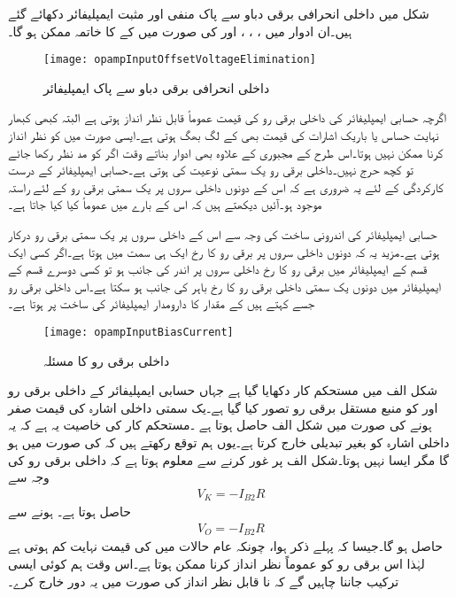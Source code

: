 شکل  میں داخلی انحرافی برقی دباو سے پاک منفی اور مثبت ایمپلیفائر دکھائے گئے ہیں۔ان ادوار میں ، ، ،  اور   کی صورت میں  کے  کا خاتمہ ممکن ہو گا۔ 
\begin{figure}
\centering
\texttt{[image: opampInputOffsetVoltageElimination]}
\caption{داخلی انحرافی برقی دباو سے پاک ایمپلیفائر}
\label{شکل_داخلی_انحرافی_برقی_دباو_سے_پاک_ایمپلیفائر}
\end{figure}
 

اگرچہ حسابی ایمپلیفائر کی داخلی برقی رو   کی قیمت عموماً قابل نظر انداز ہوتی ہے البتہ کبھی کبھار نہایت حساس یا باریک اشارات کی قیمت بھی کے لگ بھگ ہوتی ہے۔ایسی صورت میں کو نظر انداز کرنا ممکن نہیں ہوتا۔اس طرح کے مجبوری کے علاوہ بھی ادوار بناتے وقت اگر  کو مد نظر رکھا جائے تو کچھ حرج نہیں۔داخلی برقی رو یک سمتی نوعیت کی ہوتی ہے۔حسابی ایمپلیفائر کے درست کارکردگی کے لئے یہ ضروری ہے کہ اس کے دونوں داخلی سروں  پر یک سمتی برقی رو کے لئے راستہ موجود ہو۔آئیں دیکھتے ہیں کہ اس  کے بارے میں عموماً کیا کیا جاتا ہے۔

حسابی ایمپلیفائر کی اندرونی ساخت کی وجہ سے اس کے داخلی سروں پر یک سمتی برقی رو درکار ہوتی ہے۔مزید یہ کہ دونوں داخلی سروں پر برقی رو کا رخ ایک ہی سمت میں ہوتا ہے۔اگر کسی ایک قسم کے ایمپلیفائر میں برقی رو کا رخ داخلی سروں پر اندر کی جانب ہو تو کسی دوسرے قسم کے ایمپلیفائر میں دونوں یک سمتی داخلی برقی رو کا رخ باہر  کی جانب ہو سکتا ہے۔اس داخلی برقی رو جسے  کہتے ہیں کے مقدار کا دارومدار ایمپلیفائر کی ساخت پر ہوتا ہے۔
\begin{figure}
\centering
\texttt{[image: opampInputBiasCurrent]}
\caption{داخلی برقی رو کا مسئلہ}
\label{شکل_داخلی_برقی_رو_کا_مسئلہ}
\end{figure}
شکل  الف میں مستحکم کار دکھایا گیا ہے جہاں حسابی ایمپلیفائر کے داخلی برقی رو  اور کو منبع مستقل برقی رو  تصور کیا گیا ہے۔یک سمتی داخلی اشارہ  کی قیمت صفر ہونے کی صورت میں  شکل  الف     حاصل ہوتا  ہے ۔مستحکم کار کی خاصیت یہ ہے کہ یہ داخلی اشارہ کو بغیر تبدیلی خارج کرتا ہے۔یوں ہم توقع رکھتے ہیں کہ  کی صورت میں  ہو گا مگر ایسا نہیں ہوتا۔شکل  الف     پر غور کرنے سے معلوم ہوتا ہے کہ داخلی برقی رو کی وجہ سے
\begin{align*}
V_K=-I_{B2} R
\end{align*}
حاصل ہوتا ہے۔  ہونے سے
\begin{align} \label{مساوات_انحرافی_رو_سے_پیدا_دباو}
V_O=-I_{B2}R
\end{align}
حاصل ہو گا۔جیسا کہ پہلے ذکر ہوا، چونکہ عام حالات میں  کی قیمت نہایت کم ہوتی ہے لہٰذا اس برقی رو کو عموماً نظر انداز کرنا ممکن ہوتا ہے۔اس وقت ہم کوئی ایسی ترکیب جاننا چاہیں گے کہ نا قابل نظر انداز  کی صورت میں یہ دور خارج کرے۔

